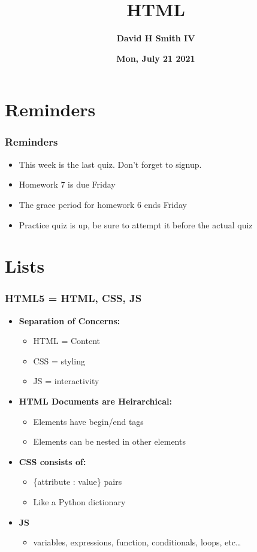 \documentclass{beamer}
\title{\textbf{HTML}}
\author{\textbf{David H Smith IV}}
\institute[\textbf{UIUC}]{\textbf{University of Illinois Urbana-Champaign}}
\date{\textbf{Mon, July 21 2021}}
\begin{document}
\frame{\titlepage}

\section{Reminders}

%
%
\begin{frame}
  \frametitle{Reminders}
  \begin{itemize}
    \item This week is the last quiz. Don't forget to signup.
    \item Homework 7 is due Friday 
    \item The grace period for homework 6 ends Friday
    \item Practice quiz is up, be sure to attempt it before the actual quiz
  \end{itemize}
\end{frame}

\section{Lists}

%
%
\begin{frame}[fragile]
  \frametitle{HTML5 = HTML, CSS, JS}
  \pause
  \begin{itemize}
    \item \textbf{Separation of Concerns: }
    \begin{itemize}
      \item HTML = Content
      \item CSS = styling
      \item JS = interactivity
    \end{itemize}
    \pause
    \item \textbf{HTML Documents are Heirarchical: }
    \begin{itemize}
      \item Elements have begin/end tags
      \item Elements can be nested in other elements
    \end{itemize}
    \pause
    \item \textbf{CSS consists of:}
    \begin{itemize}
      \item \{attribute : value\} pairs
      \item Like a Python dictionary
    \end{itemize}
    \pause
    \item \textbf{JS}
    \begin{itemize}
      \item variables, expressions, function, conditionals, loops, etc\ldots
    \end{itemize}
  \end{itemize}
\end{frame}
\end{document}
